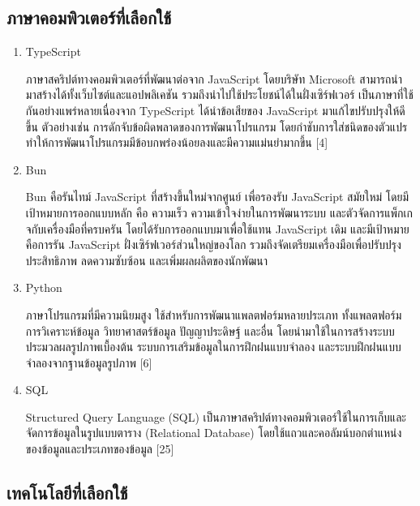 \documentclass[12pt,oneside,openright,a4paper]{cpe-thai-project}
\begin{document}
\subsection{ภาษาคอมพิวเตอร์ที่เลือกใช้}

\begin{enumerate}
\item TypeScript

	\hspace{2em} ภาษาสคริปต์ทางคอมพิวเตอร์ที่พัฒนาต่อจาก JavaScript โดยบริษัท Microsoft สามารถนำมาสร้างได้ทั้งเว็บไซต์และแอปพลิเคชัน รวมถึงนำไปใช้ประโยชน์ได้ในฝั่งเซิร์ฟเวอร์ เป็นภาษาที่ใช้กันอย่างแพร่หลายเนื่องจาก TypeScript ได้นำข้อเสียของ JavaScript 		มาแก้ไขปรับปรุงให้ดีขึ้น ตัวอย่างเช่น การดักจับข้อผิดพลาดของการพัฒนาโปรแกรม โดยกำชับการใส่ชนิดของตัวแปร ทำให้การพัฒนาโปรแกรมมีข้อบกพร่องน้อยลงและมีความแม่นยำมากขึ้น [4]
\item Bun

	\hspace{2em} Bun คือรันไทม์ JavaScript ที่สร้างขึ้นใหม่จากศูนย์ เพื่อรองรับ JavaScript สมัยใหม่ โดยมีเป้าหมายการออกแบบหลัก คือ ความเร็ว ความเข้าใจง่ายในการพัฒนาระบบ และตัวจัดการแพ็กเกจกับเครื่องมือที่ครบครัน โดยได้รับการออกแบบมาเพื่อใช้แทน JavaScript เดิม และมีเป้าหมายคือการรัน JavaScript ฝั่งเซิร์ฟเวอร์ส่วนใหญ่ของโลก รวมถึงจัดเตรียมเครื่องมือเพื่อปรับปรุงประสิทธิภาพ ลดความซับซ้อน และเพิ่มผลผลิตของนักพัฒนา
\item Python

	\hspace{2em} ภาษาโปรแกรมที่มีความนิยมสูง ใช้สำหรับการพัฒนาแพลตฟอร์มหลายประเภท ทั้งแพลตฟอร์ม การวิเคราะห์ข้อมูล วิทยาศาสตร์ข้อมูล ปัญญาประดิษฐ์ และอื่น
โดยนำมาใช้ในการสร้างระบบประมวลผลรูปภาพเบื้องต้น ระบบการเสริมข้อมูลในการฝึกฝนแบบจำลอง และระบบฝึกฝนแบบจำลองจากฐานข้อมูลรูปภาพ [6]
\item SQL

	\hspace{2em} Structured Query Language (SQL) เป็นภาษาสคริปต์ทางคอมพิวเตอร์ใช้ในการเก็บและจัดการข้อมูลในรูปแบบตาราง (Relational Database) โดยใช้แถวและคอลัมน์บอกตำแหน่งของข้อมูลและประเภทของข้อมูล [25]
\end{enumerate}

\subsection{เทคโนโลยีที่เลือกใช้}
\end{document}
